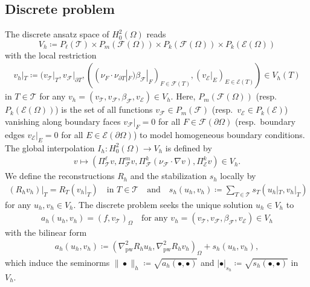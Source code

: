 \documentclass[a4paper]{amsart}
\numberwithin{equation}{section}
\def\F{\mathcal{F}}
\def\E{\mathcal{E}}
\def\T{\mathcal{T}}
\def\pw{\mathrm{pw}}
\theoremstyle{definition}
\theoremstyle{remark}
\numberwithin{theorem}{section}
\numberwithin{equation}{section}
\numberwithin{table}{section}
\numberwithin{figure}{section}
\begin{document}
\subsection{Discrete problem}
The discrete ansatz space of $H^2_0(\Omega)$ reads
\begin{equation*}
	V_h \coloneqq P_\ell(\mathcal{T}) \times P_{m}(\mathcal{F}(\Omega)) \times P_k(\F(\Omega)) \times P_k(\E(\Omega))
\end{equation*}
with the local restriction 
\begin{align*}
    v_h|_T \coloneqq (v_\T|_T, v_\F|_{\partial T}, ((\nu_F \cdot \nu_{\partial T}|_F) \beta_\F|_{F})_{F \in \F(T)}, (v_\E|_E)_{E \in \E(T)}) \in V_h(T)
\end{align*}
in $T \in \T$
for any $v_h = (v_\T, v_\F, \beta_\F, v_\E) \in V_h$.
Here, $P_{m}(\mathcal{F}(\Omega))$ (resp.~$P_k(\E(\Omega))$) is the set of all functions $v_\F \in P_m(\F)$ (resp.~$v_\E \in P_k(\E)$) vanishing along boundary faces $v_\F|_F = 0$ for all $F \in \F(\partial \Omega)$ (resp.~boundary edges $v_\E|_E = 0$ for all $E \in \E(\partial \Omega)$) to model homogeneous boundary conditions. The global interpolation $I_h:H_0^2(\Omega) \rightarrow V_h$ is defined by
\begin{align*}
    v \mapsto (\Pi_{\mathcal{T}}^\ell v, \Pi_{\mathcal{F}}^m v, \Pi_{\mathcal{F}}^k (\nu_{\mathcal{F}}\cdot\nabla v), \Pi_{\mathcal{E}}^k v) \in V_h.
\end{align*}
We define the reconstructions $R_h$ and the stabilization $s_h$ locally by
\begin{align}
    (R_h v_h)|_T = R_T (v_h|_T) \quad\text{in } T \in \T \quad\text{and}\quad s_h(u_h,v_h) \coloneqq \sum_{T \in \T} s_T(u_h|_T, v_h|_T)
\end{align}
for any $u_h,v_h \in V_h$. The discrete problem seeks the unique solution $u_h \in V_h$ to
\begin{align}\label{def:discrete_problem}
    a_h(u_h,v_h) = (f,v_\T)_\Omega \quad\text{for any } v_h = (v_\T, v_\F, \beta_\F, v_\E) \in V_h
\end{align}
with the bilinear form
\begin{align*}
    a_h(u_h,v_h) \coloneqq (\nabla_\pw^2 R_h u_h, \nabla_\pw^2 R_h v_h)_\Omega + s_h(u_h,v_h),
\end{align*}
which induce the seminorms $\|\bullet\|_h \coloneqq \sqrt{a_h(\bullet,\bullet)}$ and $|\bullet|_{s_h} \coloneqq \sqrt{s_h(\bullet,\bullet)}$ in $V_h$.
\end{document}

